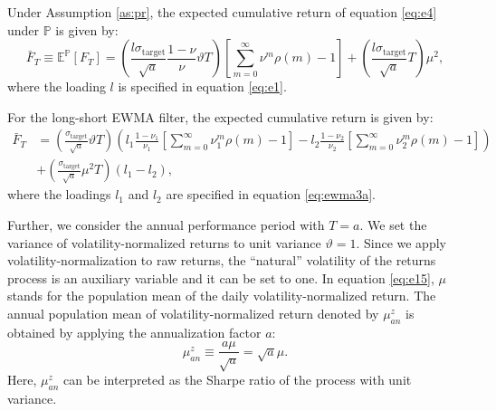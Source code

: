 \documentclass[hidelinks]{siamonline250211}
\begin{document}
\begin{corollary}\label{col:cumreturn} Under Assumption \ref{as:pr}, the expected cumulative return of equation \eqref{eq:e4} under $\mathbb{P}$ is given by:
	\begin{equation} \label{eq:ft1} 
		\bar{F}_{T} \equiv \mathbb{E}^{\mathbb{P}} \left[ F_{T}\right] = \left( \frac{l\sigma_{\mathrm{target}} }{\sqrt{a}}  \frac{1-\nu }{\nu}    \vartheta T \right)   \left[ \sum^{\infty}_{m=0} \nu^{m}\rho(m) -  1 \right]  +  \left( \frac{l\sigma_{\mathrm{target}} }{\sqrt{a}}  T \right)   \mu^{2},  
	\end{equation}
	where the loading $l$ is specified in equation \eqref{eq:e1}.
	
	
	For the long-short EWMA filter, the expected cumulative return is given by:
	\begin{equation} \label{eq:ft2} 
		\begin{split}
			\bar{F}_{T}  &   = \left( \frac{\sigma_{\mathrm{target}} }{\sqrt{a}}  \vartheta T\right) \left( l_{1}\frac{1-\nu_{1} }{\nu_{1}}  \left[ \sum^{\infty}_{m=0} \nu^{m}_{1}\rho(m) -  1 \right]  -  l_{2}\frac{1-\nu_{2} }{\nu_{2}}  \left[ \sum^{\infty}_{m=0} \nu^{m}_{2}\rho(m) -  1 \right]\right)\\
			& +  \left( \frac{\sigma_{\mathrm{target}} }{\sqrt{a}}  \mu^{2}   T \right)    \left(l_{1}-l_{2}\right),
		\end{split}
	\end{equation}
	where the loadings $l_{1}$ and $l_{2}$ are specified in equation \eqref{eq:ewma3a}.
	
\end{corollary}



Further, we consider the annual performance period with $T=a$. We set the variance of volatility-normalized returns to unit variance $\vartheta=1$. Since we apply volatility-normalization to raw returns, the ``natural'' volatility of the returns process is an auxiliary variable and it can be set to one. In equation \eqref{eq:e15}, $\mu$ stands for the population mean of the daily volatility-normalized return. The annual population mean of volatility-normalized return denoted by $\mu^{z}_{an}$ is obtained by applying the annualization factor $a$:
\begin{equation} \label{eq:er2a} 
	\mu^{z}_{an} \equiv \frac{a \mu }{\sqrt{a}} = \sqrt{a} \mu. 
\end{equation}
Here, $\mu^{z}_{an}$ can be interpreted as the Sharpe ratio of the process with unit variance.
\end{document}
